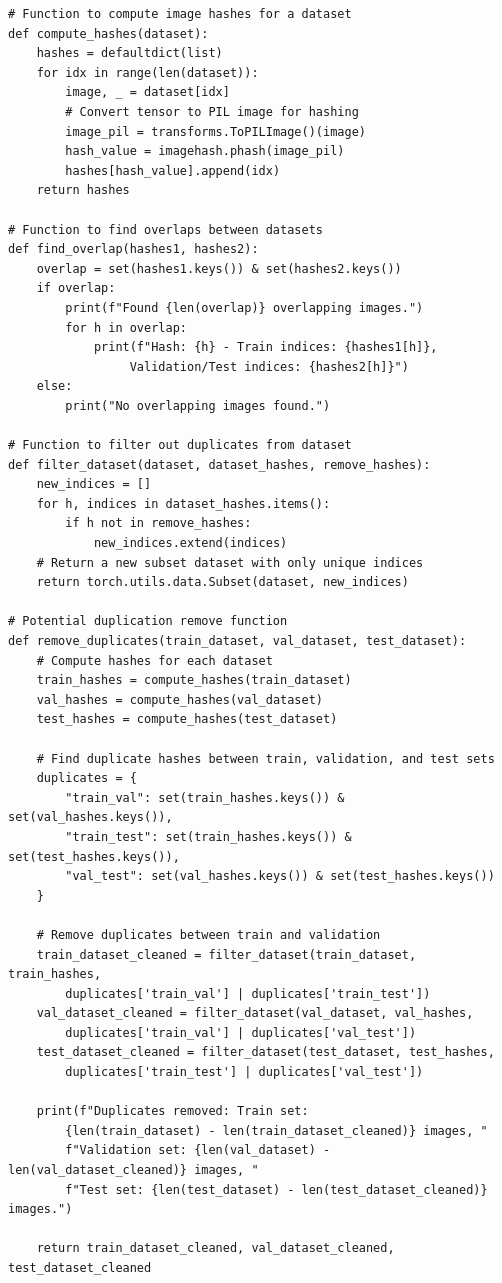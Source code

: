 \documentclass[11pt, oneside]{article}   	%
\begin{document}
\begin{verbatim}
# Function to compute image hashes for a dataset
def compute_hashes(dataset):
    hashes = defaultdict(list)
    for idx in range(len(dataset)):
        image, _ = dataset[idx]
        # Convert tensor to PIL image for hashing
        image_pil = transforms.ToPILImage()(image)
        hash_value = imagehash.phash(image_pil)
        hashes[hash_value].append(idx)
    return hashes

# Function to find overlaps between datasets
def find_overlap(hashes1, hashes2):
    overlap = set(hashes1.keys()) & set(hashes2.keys())
    if overlap:
        print(f"Found {len(overlap)} overlapping images.")
        for h in overlap:
            print(f"Hash: {h} - Train indices: {hashes1[h]},
                 Validation/Test indices: {hashes2[h]}")
    else:
        print("No overlapping images found.")

# Function to filter out duplicates from dataset
def filter_dataset(dataset, dataset_hashes, remove_hashes):
    new_indices = []
    for h, indices in dataset_hashes.items():
        if h not in remove_hashes:
            new_indices.extend(indices)
    # Return a new subset dataset with only unique indices
    return torch.utils.data.Subset(dataset, new_indices)

# Potential duplication remove function
def remove_duplicates(train_dataset, val_dataset, test_dataset):
    # Compute hashes for each dataset
    train_hashes = compute_hashes(train_dataset)
    val_hashes = compute_hashes(val_dataset)
    test_hashes = compute_hashes(test_dataset)

    # Find duplicate hashes between train, validation, and test sets
    duplicates = {
        "train_val": set(train_hashes.keys()) & set(val_hashes.keys()),
        "train_test": set(train_hashes.keys()) & set(test_hashes.keys()),
        "val_test": set(val_hashes.keys()) & set(test_hashes.keys())
    }

    # Remove duplicates between train and validation
    train_dataset_cleaned = filter_dataset(train_dataset, train_hashes, 
        duplicates['train_val'] | duplicates['train_test'])
    val_dataset_cleaned = filter_dataset(val_dataset, val_hashes, 
        duplicates['train_val'] | duplicates['val_test'])
    test_dataset_cleaned = filter_dataset(test_dataset, test_hashes, 
        duplicates['train_test'] | duplicates['val_test'])

    print(f"Duplicates removed: Train set:
        {len(train_dataset) - len(train_dataset_cleaned)} images, "
        f"Validation set: {len(val_dataset) - len(val_dataset_cleaned)} images, "
        f"Test set: {len(test_dataset) - len(test_dataset_cleaned)} images.")

    return train_dataset_cleaned, val_dataset_cleaned, test_dataset_cleaned
\end{verbatim}
\end{document}
